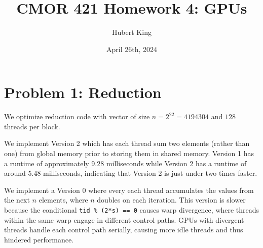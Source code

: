 \documentclass{article}
\title{CMOR 421 Homework 4: GPUs}
\author{Hubert King}
\date{April 26th, 2024}
\begin{document}
\maketitle

\section*{Problem 1: Reduction}
We optimize reduction code with vector of size $n = 2^{22}=4194304$ and $128$ threads per block. 

We implement Version 2 which has each thread sum two elements (rather than one) from global memory prior to storing them in shared memory. Version 1 has a runtime of approximately 9.28 milliseconds while Version 2 has a runtime of around 5.48 milliseconds, indicating that Version 2 is just under two times faster.

We implement a Version 0 where every each thread accumulates the values from the next $n$ elements, where $n$ doubles on each iteration. This version is slower because the conditional \verb|tid % (2*s) == 0|
causes warp divergence, where threads within the same warp engage in different control paths. GPUs with divergent threads handle each control path serially, causing more idle threads and thus hindered performance.
\end{document}
